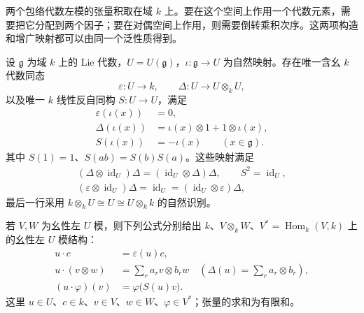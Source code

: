 两个包络代数左模的张量积取在域 \(k\) 上。要在这个空间上作用一个代数元素，需要把它分配到两个因子；要在对偶空间上作用，则需要倒转乘积次序。这两项构造和增广映射都可以由同一个泛性质得到。
\begin{proposition}\label{b5:prop:enveloping-tensor-antipode}
	设 \(\mathfrak g\) 为域 \(k\) 上的 Lie 代数，\(U=U(\mathfrak g)\)，\(\iota:\mathfrak g\to U\) 为自然映射。存在唯一含幺 \(k\) 代数同态
	\[
		\varepsilon:U\longrightarrow k,\qquad \Delta:U\longrightarrow U\otimes_k U,
	\]
	以及唯一 \(k\) 线性反自同构 \(S:U\to U\)，满足
	\[
		\begin{aligned}
			\varepsilon(\iota(x))&=0,\\
			\Delta(\iota(x))&=\iota(x)\otimes1+1\otimes\iota(x),\\
			S(\iota(x))&=-\iota(x) \qquad(x\in\mathfrak g).
		\end{aligned}
	\]
	其中 \(S(1)=1\)、\(S(ab)=S(b)S(a)\)。这些映射满足
	\[
		\begin{gathered}
			(\Delta\otimes\operatorname{id}_U)\Delta =(\operatorname{id}_U\otimes\Delta)\Delta,\qquad S^2=\operatorname{id}_U,\\
			(\varepsilon\otimes\operatorname{id}_U)\Delta =\operatorname{id}_U =(\operatorname{id}_U\otimes\varepsilon)\Delta,
		\end{gathered}
	\]
	最后一行采用 \(k\otimes_k U\cong U\cong U\otimes_k k\) 的自然识别。

	若 \(V,W\) 为幺性左 \(U\) 模，则下列公式分别给出 \(k\)、\(V\otimes_k W\)、\(V^*=\operatorname{Hom}_k(V,k)\) 上的幺性左 \(U\) 模结构：
	\[
		\begin{aligned}
			u\cdot c&=\varepsilon(u)c,\\
			u\cdot(v\otimes w)&=\sum_r a_rv\otimes b_rw \quad\left(\Delta(u)=\sum_r a_r\otimes b_r\right),\\
			(u\cdot\varphi)(v)&=\varphi\bigl(S(u)v\bigr).
		\end{aligned}
	\]
	这里 \(u\in U\)、\(c\in k\)、\(v\in V\)、\(w\in W\)、\(\varphi\in V^*\)；张量的求和为有限和。
\end{proposition}
